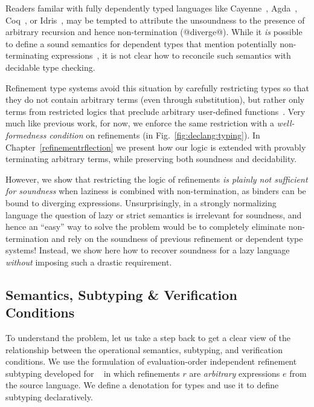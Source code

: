 Readers familar 
with fully dependently typed languages like 
Cayenne~\cite{cayenne}, Agda~\cite{norell07}, 
Coq~\cite{coq-book}, or Idris~\cite{Brady13}, may be
tempted to attribute the unsoundness to the presence 
of arbitrary recursion and hence non-termination 
(\eg @diverge@).
While it \emph{is} possible to define a sound semantics 
for dependent types that mention potentially non-terminating
expressions~\citep{Knowles10}, it is not clear how to reconcile
such semantics with decidable type checking. 

Refinement type systems avoid this situation by carefully restricting 
types so that they do not contain arbitrary terms (even through 
substitution), but rather only terms from restricted logics that
preclude arbitrary user-defined functions~\cite{pfenningxi98,Dunfield07,fstar}.
Very much like previous work, for now, we enforce the same restriction
with a \emph{well-formedness condition} on 
refinements (\rwbased in Fig.~\ref{fig:declang:typing}).
%
In Chapter~\ref{refinementrflection} we present how 
our logic is extended with provably terminating arbitrary terms, 
while preserving both soundness and decidability.

However, we show that restricting the logic of refinements
\emph{is plainly not sufficient for soundness} 
when laziness is combined with non-termination, 
as binders can be bound to diverging expressions. 
Unsurprisingly, in a strongly
normalizing language the question of lazy or strict semantics is irrelevant for soundness, and hence 
an ``easy'' way to solve the problem would be to completely eliminate non-termination and rely on the soundness
of previous refinement or dependent type systems! Instead, we show here how to 
recover soundness for a lazy language \emph{without} imposing such a drastic requirement. 


\subsection{Semantics, Subtyping \& Verification Conditions} \label{sec:den-sem}

To understand the problem, let us take a step 
back to get a clear view of the relationship 
between the operational semantics, subtyping,
and verification conditions.
%
We use the formulation of evaluation-order 
independent refinement subtyping developed 
for \hlang~\cite{Knowles10} in which 
refinements $r$ are \emph{arbitrary} expressions $e$ from the source language.
We define a denotation for types and use it 
to define subtyping declaratively.


